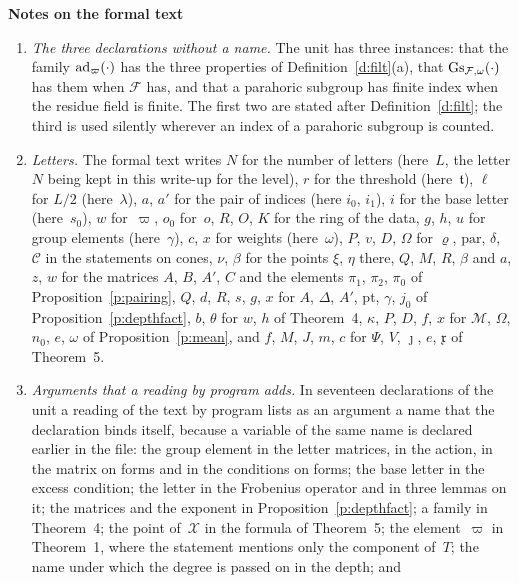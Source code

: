 \documentclass[11pt,a4paper]{article}
\newcommand{\m}[1]{\mbox{$#1$}}        %
\newcommand{\sect}[2]{\refstepcounter{section}\label{#2}\par\addvspace{19pt plus 4pt minus 2pt}\Needspace{7\baselineskip}%
  \noindent\llap{{\fontsize{13.2}{16}\selectfont\bfseries\color{inkfaint}\thesection}\hspace{9pt}}%
  {\fontsize{13.2}{16}\selectfont\bfseries\color{ink}#1}\par\nopagebreak\vspace{-1pt}}
\theoremstyle{plainx}
\theoremstyle{uprightx}
\newcommand{\cF}{\mathcal{F}}
\newcommand{\cX}{\mathcal{X}}
\newcommand{\cC}{\mathcal{C}}
\newcommand{\cM}{\mathcal{M}}
\newcommand{\fx}{\mathfrak{x}}
\newcommand{\thr}{\mathfrak{t}}        %
\newcommand{\pa}{\mathrm{par}}          %
\begin{document}
\sect{Notes on the formal text}{s:notes}
\begin{enumerate}[label=\textup{\arabic*.},leftmargin=1.6em,itemsep=5pt]
\item \emph{The three declarations without a name.} The unit has three instances: that the family
\m{\adic{\varpi}{\cdot}} has the three properties of Definition~\ref{d:filt}(a), that
\m{\gauss{\cF}{\omega}{\cdot}} has them when $\cF$ has, and that a
parahoric subgroup has finite index when the residue field is finite. The first two are stated after
Definition~\ref{d:filt}; the third is used silently wherever an index of a parahoric subgroup is counted.
\item \emph{Letters.} The formal text writes $N$ for the number of letters (here~$L$, the letter $N$ being kept
in this write-up for the level), $r$ for the threshold (here~$\thr$), $\ell$ for \m{L/2} (here~$\lambda$), $a$,
$a'$ for the pair of indices (here \m{i_0}, \m{i_1}), $i$ for the base letter (here~$s_0$), $w$ for~$\varpi$,
\m{o_0} for~$o$, $R$, $O$, $K$ for the ring of the data, $g$, $h$, $u$ for group elements (here~$\gamma$), $c$,
$x$ for weights (here~$\omega$), $P$, $v$, $D$, $\Omega$ for \m{\varrho}, \m{\pa}, \m{\delta}, $\cC$ in the
statements on cones, $\nu$, $\beta$ for the points $\xi$, $\eta$ there, $Q$, $M$, $R$, $\beta$ and $a$, $z$, $w$ for
the matrices $A$, $B$, $A'$, $C$ and the elements \m{\pi_1}, \m{\pi_2}, \m{\pi_0} of Proposition~\ref{p:pairing},
$Q$, $d$, $R$, $s$, $g$, $x$ for $A$, $\Delta$, $A'$, \m{\mathrm{pt}}, $\gamma$, \m{j_0} of
Proposition~\ref{p:depthfact}, $b$, $\theta$ for $w$, $h$ of Theorem~4, $\kappa$, $P$, $D$, $f$, $x$ for $\cM$,
$\Omega$, \m{n_0}, $e$, $\omega$ of Proposition~\ref{p:mean}, and $f$, $M$, $J$, $m$, $c$ for $\Psi$, $V$,
$\jmath$, $e$, $\fx$ of Theorem~5.
\item \emph{Arguments that a reading by program adds.} In seventeen declarations of the unit a reading of the
text by program lists as an argument a name that the declaration binds itself, because a variable of the same
name is declared earlier in the file: the group element in the letter matrices, in the action, in the matrix
on forms and in the conditions on forms; the base letter in the excess condition; the letter in the Frobenius
operator and in three lemmas on it; the matrices and the exponent in Proposition~\ref{p:depthfact}; a family in
Theorem~4; the point of~$\cX$ in the formula of Theorem~5; the element~$\varpi$ in Theorem~1, where the
statement mentions only the component of~$T$; the name under which the degree is passed on in the depth; and

\end{enumerate}
\end{document}
